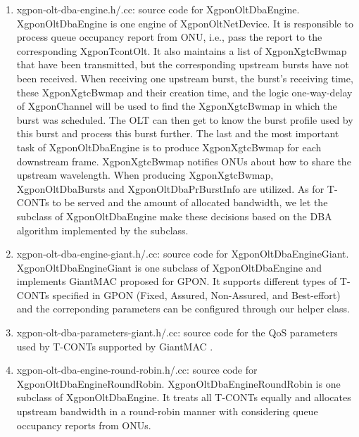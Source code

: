 \begin{enumerate}
 \item xgpon-olt-dba-engine.h/.cc: source code for {\color{red} XgponOltDbaEngine}. XgponOltDbaEngine is one engine 
of XgponOltNetDevice. It is responsible to process queue occupancy report from ONU, i.e., pass the report to 
the corresponding XgponTcontOlt. It also maintains a list of XgponXgtcBwmap that have been transmitted, 
but the corresponding upstream bursts have not been received. When receiving one upstream burst, 
the burst's receiving time, these XgponXgtcBwmap and their creation time, and the logic one-way-delay 
of XgponChannel will be used to find the XgponXgtcBwmap in which the burst was scheduled. 
The OLT can then get to know the burst profile used by this burst and process this burst further. 
The last and the most important task of XgponOltDbaEngine is to produce XgponXgtcBwmap for each downstream frame. 
XgponXgtcBwmap notifies ONUs about how to share the upstream wavelength. When producing XgponXgtcBwmap, 
XgponOltDbaBursts and XgponOltDbaPrBurstInfo are utilized. As for T-CONTs to be served and the amount of 
allocated bandwidth, we let the subclass of XgponOltDbaEngine make these decisions based on the DBA algorithm 
implemented by the subclass.

 \item xgpon-olt-dba-engine-giant.h/.cc: source code for {\color{red} XgponOltDbaEngineGiant}. 
XgponOltDbaEngineGiant is one subclass of XgponOltDbaEngine and implements GiantMAC 
\cite{leligou06GiantMACforGPON} proposed for GPON. It supports different types of T-CONTs
specified in GPON (Fixed, Assured, Non-Assured, and Best-effort) and the correponding parameters 
can be configured through our helper class.

 \item xgpon-olt-dba-parameters-giant.h/.cc: source code for the QoS parameters used by T-CONTs
supported by GiantMAC \cite{leligou06GiantMACforGPON}.



 \item xgpon-olt-dba-engine-round-robin.h/.cc: source code for {\color{red} XgponOltDbaEngineRoundRobin}. 
XgponOltDbaEngineRoundRobin is one subclass of XgponOltDbaEngine. It treats all T-CONTs equally and allocates 
upstream bandwidth in a round-robin manner with considering queue occupancy reports from ONUs.


\end{enumerate}
